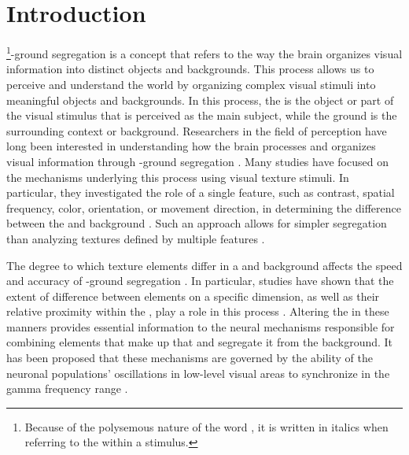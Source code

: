 \section{Introduction}
\label{sec:introduction}

\stimfigcap\footnote{
    Because of the polysemous nature of the word , it is written in italics when referring to the \stimfig{} within a stimulus.
}-ground segregation is a concept that refers to the way the brain organizes visual information into distinct objects and backgrounds. This process allows us to perceive and understand the world by organizing complex visual stimuli into meaningful objects and backgrounds. In this process, the \stimfig{} is the object or part of the visual stimulus that is perceived as the main subject, while the ground is the surrounding context or background. Researchers in the field of perception have long been interested in understanding how the brain processes and organizes visual information through \stimfig-ground segregation \cite{Julesz1983, Julesz1984, Nothdurft1985a, Williams1992, Wagemans2012}.
Many studies have focused on the mechanisms underlying this process using visual texture stimuli. In particular, they investigated the role of a single feature, such as contrast, spatial frequency, color, orientation, or movement direction, in determining the difference between the \stimfig{} and background \cite{Hadjipapas2015, Bredfeldt2002, Henriksson2008, Shapley2011, Lamme1995}. Such an approach allows for simpler segregation than analyzing textures defined by multiple features \cite{Sagi1984, Treisman1980}.

The degree to which texture elements differ in a \stimfig{} and background affects the speed and accuracy of \stimfig-ground segregation \cite{Nothdurft1985a, Nothdurft1985b, Landy1991, Motoyoshi1999, Nothdurft1991a, Nothdurft1991b, DeWeerd1992}.
In particular, studies have shown that the extent of difference between elements on a specific dimension, as well as their relative proximity within the \stimfig, play a role in this process \cite{MaryamPLACEHOLDER}. Altering the \stimfig{} in these manners provides essential information to the neural mechanisms responsible for combining elements that make up that \stimfig{} and segregate it from the background. It has been proposed that these mechanisms are governed by the ability of the neuronal populations' oscillations in low-level visual areas to synchronize in the gamma frequency range \cite{Malsburg1995, Singer1995a, Gray1999}.

